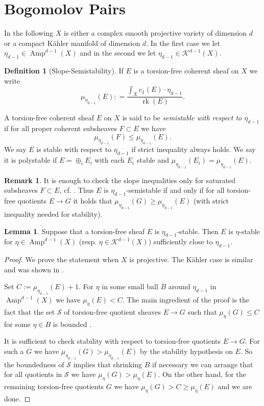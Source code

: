 \documentclass[a4,reqno]{amsart}
\theoremstyle{definition}
\newtheorem{definition}[theorem]{Definition}
\newtheorem{lemma}[theorem]{Lemma}
\newtheorem{remark}[theorem]{Remark}
\def\cK{\mathcal K}
\DeclareMathOperator{\Amp}{Amp}
\DeclareMathOperator{\rk}{rk}
\numberwithin{equation}{section}
\begin{document}
\section{Bogomolov Pairs}\label{sec:bogomolovpairs}

In the following $X$ is either a complex smooth projective variety of dimension $d$ or a compact K\"ahler manifold of dimension $d$.  In the first case we let $\eta_{d-1}\in \Amp^{d-1}(X)$ and in the second we let $\eta_{d-1}\in \cK^{d-1}(X)$.

\begin{definition}[Slope-Semistability]\label{def:sstability}
If $E$ is a torsion-free coherent sheaf on $X$ we write
$$\mu_{\eta_{d-1}}(E) : = \frac{\int_X c_1(E) \cdot \eta_{d-1}}{\rk(E)}.$$


 A torsion-free coherent sheaf $E$ on $X$ is said to be \emph{semistable with respect to $\eta_{d-1}$} if for all proper coherent subsheaves $F\subset E$ we have
$$\mu_{\eta_{d-1}}(F)\le \mu_{\eta_{d-1}}(E).$$
We say $E$ is stable with respect to $\eta_{d-1}$ if strict inequality always holds.  We say it is polystable if $E=\oplus_i E_i$ with each $E_i$ stable and $\mu_{\eta_{d-1}}(E_i)=\mu_{\eta_{d-1}}(E)$.
\end{definition}

\begin{remark}
It is enough to check the slope inequalities only for saturated subsheaves $F \subset E$, cf. \cite[Corollary 2.14]{GKP-Movable}.  Thus $E$ is $\eta_{d-1}$-semistable if and only if for all torsion-free quotients $E\to G$ it holds that $\mu_{\eta_{d-1}}(G)\ge \mu_{\eta_{d-1}}(E)$ (with strict inequality needed for stability).
\end{remark}



\begin{lemma}\label{lem:stabilityisopen}
Suppose that a torsion-free sheaf $E$ is $\eta_{d-1}$-stable.  Then $E$ is $\eta$-stable for $\eta\in \Amp^{d-1}(X)$ (resp. $\eta\in \cK^{d-1}(X)$) sufficiently close to $\eta_{d-1}$.
\end{lemma}
\begin{proof}
We prove the statement when $X$ is projective. The K\"ahler case is similar and was shown in \cite[Corollary 6.9]{TomaLimitareaII}.

Set $C:= \mu_{\eta_{d-1}}(E)+1$.  For $\eta$ in some small ball $B$ around $\eta_{d-1}$ in $\Amp^{d-1}(X)$ we have $\mu_\eta(E)< C$.  The main ingredient of the proof is the fact that the set $\mathcal S$ of torsion-free quotient sheaves $E\to G$ such that $\mu_\eta(G)\le C$ for some $\eta \in B$ is bounded \cite[Theorem 3.1]{MegyPavelToma}.  

It is sufficient to check stability with respect to torsion-free quotients $E\to G$. For such a $G$ we have $\mu_{\eta_{d-1}}(G) > \mu_{\eta_{d-1}}(E)$ by the stability hypothesis on $E$.  So the boundedness of $\mathcal S$  implies that shrinking $B$ if necessary we can arrange that for all quotients in $\mathcal S$ we have $\mu_{\eta}(G) > \mu_{\eta}(E)$.  On the other hand, for the remaining torsion-free quotients $G$ we have $\mu_{\eta}(G)> C \ge \mu_{\eta}(E)$ and we are done.
\end{proof}
\end{document}
